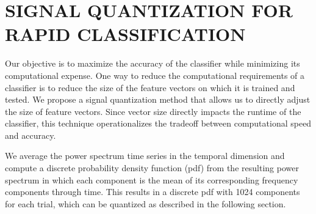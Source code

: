 
\section{\uppercase{Signal Quantization For Rapid Classification}}
\label{sec:quantization}


\noindent Our objective is to maximize the accuracy of the classifier while minimizing its computational expense. One way to reduce the computational requirements of a classifier is to reduce the size of the feature vectors on which it is trained and tested. We propose a signal quantization method that allows us to directly adjust the size of feature vectors. Since vector size directly impacts the runtime of the classifier, this technique operationalizes the tradeoff between computational speed and accuracy.



We average the power spectrum time series in the temporal dimension and compute a discrete probability density function (pdf) from the resulting power spectrum in which each component is the mean of its corresponding frequency components through time. This results in a discrete pdf with 1024 components
for each trial, which can be quantized as described in the following section.


